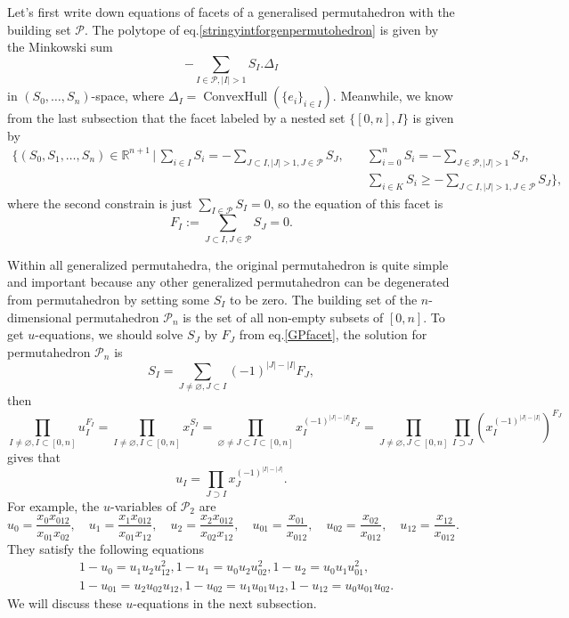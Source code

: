 \documentclass[hidelinks,12pt]{article}
\begin{document}
Let's first write down equations of facets of a generalised permutahedron
with the building set $\mathscr P$. The polytope of 
eq.\eqref{stringyintforgenpermutohedron} is given by the Minkowski sum
\[
	- \sum_{I\in\mathscr P,|I|>1}S_I.\Delta_I
\]
in $(S_0,\dots,S_n)$-space, where $\Delta_I=\operatorname{ConvexHull}
(\{e_i\}_{i\in I})$. Meanwhile, we know from the last subsection that the facet 
labeled by a nested set $\{[0,n],I\}$ is given by
\begin{align*}
	\biggl\{(S_0,S_1,\dots,S_n)\in \mathbb R^{n+1}\,\bigg |\,
		\sum_{i\in I}S_i = -\sum_{J\subset I,|J|>1,J\in \mathscr P}S_J,
		\quad
		&\sum_{i=0}^nS_i=-\sum_{J\in \mathscr P,|J|>1}S_J,\\
		&\sum_{i\in K}S_i\geq -\sum_{J\subset I,|J|>1,J\in \mathscr P}S_J
	\biggr\},
\end{align*}
where the second constrain is just $\sum_{I\in \mathscr P}S_I=0$, so the equation 
of this facet is 
\begin{equation}\label{GPfacet}
	F_I:=\sum_{J\subset I,J\in\mathscr P}S_J=0.
\end{equation}

Within all generalized permutahedra, the original permutahedron is quite simple
and important because any other generalized permutahedron can be degenerated from
permutahedron by setting some $S_I$ to be zero.
The building set of the $n$-dimensional permutahedron $\mathscr P_n$ is 
the set of all non-empty subsets of $[0,n]$. 
To get $u$-equations, we should solve $S_J$ by $F_J$ from eq.\eqref{GPfacet}, the 
solution for permutahedron $\mathscr P_n$ is 
\begin{equation}\label{SinF}
	S_I=\sum_{J\neq \varnothing,J\subset I} (-1)^{|J|-|I|}F_J,
\end{equation}
then
\[
	\prod_{I\neq \varnothing,I\subset [0,n]}u_I^{F_I}=
	\prod_{I\neq \varnothing,I\subset [0,n]}x_I^{S_I}=
	\prod_{\varnothing\neq J\subset I\subset [0,n]}
	x_I^{(-1)^{|J|-|I|}F_J}=
	\prod_{J\neq \varnothing,J\subset [0,n]}
	\prod_{I\supset J}(x_I^{(-1)^{|J|-|I|}})^{F_J}
\]
gives that
\[
	u_I=\prod_{J\supset I}x_J^{(-1)^{|I|-|J|}}.
\]
For example, the $u$-variables of $\mathscr P_2$ are
\[
	u_{0}  = \frac{x_0 x_{012}}{x_{01}x_{02}},\quad 
	u_{1}  = \frac{x_1 x_{012}}{x_{01}x_{12}},\quad
	u_{2}  = \frac{x_2 x_{012}}{x_{02}x_{12}},\quad
	u_{01} = \frac{x_{01}}{x_{012}},\quad 
	u_{02} = \frac{x_{02}}{x_{012}},\quad
	u_{12} = \frac{x_{12}}{x_{012}}.
\]
They satisfy the following equations
\begin{align*}
	&1-u_{0}=u_{1} u_{2} u_{12}^2,
	1-u_{1}=u_{0} u_{2} u_{02}^2,
	1-u_{2}=u_{0} u_{1} u_{01}^2,\\
	&1-u_{01}=u_{2} u_{02} u_{12},
	1-u_{02}=u_{1} u_{01} u_{12},
	1-u_{12}=u_{0} u_{01} u_{02}.
\end{align*}
We will discuss these $u$-equations in the next subsection.
\end{document}
